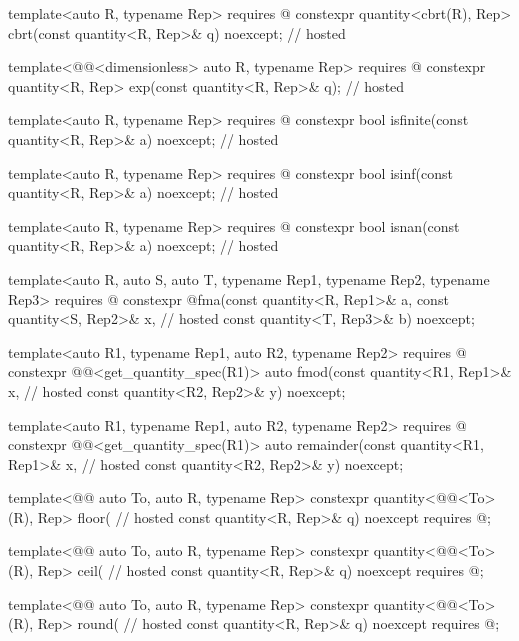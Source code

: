 \begin{codeblock}
{template<auto R, typename Rep>
  requires @\seebelownc@
constexpr quantity<cbrt(R), Rep> cbrt(const quantity<R, Rep>& q) noexcept;              // hosted

template<@@<dimensionless> auto R, typename Rep>
  requires @\seebelownc@
constexpr quantity<R, Rep> exp(const quantity<R, Rep>& q);                              // hosted

template<auto R, typename Rep>
  requires @\seebelownc@
constexpr bool isfinite(const quantity<R, Rep>& a) noexcept;                            // hosted

template<auto R, typename Rep>
  requires @\seebelownc@
constexpr bool isinf(const quantity<R, Rep>& a) noexcept;                               // hosted

template<auto R, typename Rep>
  requires @\seebelownc@
constexpr bool isnan(const quantity<R, Rep>& a) noexcept;                               // hosted

template<auto R, auto S, auto T, typename Rep1, typename Rep2, typename Rep3>
  requires @\seebelownc@
constexpr @\seebelownc@ fma(const quantity<R, Rep1>& a, const quantity<S, Rep2>& x,         // hosted
                        const quantity<T, Rep3>& b) noexcept;

template<auto R1, typename Rep1, auto R2, typename Rep2>
  requires @\seebelownc@
constexpr @@<get_quantity_spec(R1)> auto fmod(const quantity<R1, Rep1>& x,      // hosted
                                                      const quantity<R2, Rep2>& y) noexcept;

template<auto R1, typename Rep1, auto R2, typename Rep2>
  requires @\seebelownc@
constexpr @@<get_quantity_spec(R1)> auto remainder(const quantity<R1, Rep1>& x, // hosted
                                                           const quantity<R2, Rep2>& y) noexcept;

template<@@ auto To, auto R, typename Rep>
constexpr quantity<@@<To>(R), Rep> floor(                             // hosted
  const quantity<R, Rep>& q) noexcept
  requires @\seebelownc@;

template<@@ auto To, auto R, typename Rep>
constexpr quantity<@@<To>(R), Rep> ceil(                              // hosted
  const quantity<R, Rep>& q) noexcept
  requires @\seebelownc@;

template<@@ auto To, auto R, typename Rep>
constexpr quantity<@@<To>(R), Rep> round(                             // hosted
  const quantity<R, Rep>& q) noexcept
  requires @\seebelownc@;

}
\end{codeblock}
